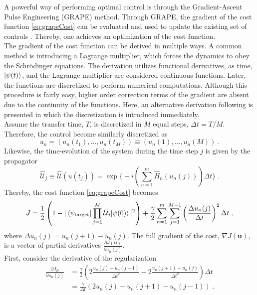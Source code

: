 A powerful way of performing optimal control is through the Gradient-Ascent Pulse Engineering (GRAPE) method. Through GRAPE, the gradient of the cost function \eqref{eq:grapeCost} can be evaluated and used to update the existing set of controls \cite{Khaneja2005}. Thereby, one achieves an optimization of the cost function.\\
The gradient of the cost function can be derived in multiple ways. A common method \cite{Hohenester2007, Winckel2008, BECcontrol} is introducing a Lagrange multiplier, which forces the dynamics to obey the Schrödinger equations. The derivation utilizes functional derivatives, as time, $\ket{\psi (t)}$, and the Lagrange multiplier are considered continuous functions. Later, the functions are discretized to perform numerical computations. Although this procedure is fairly easy, higher order correction terms of the gradient are absent due to the continuity of the functions. Here, an alternative derivation following \cite{Khaneja2005, deFouquieres2011} is presented in which the discretization is introduced immediately. \\
Assume the transfer time, $T$, is discretized in $M$ equal steps, $\Delta t = T/M$. Therefore, the control become similarly discretized as
\begin{equation}
	u_n = \left( u_n (t_1) , \ldots , u_n (t_M)  \right) \equiv \left( u_n (1) , \ldots , u_n (M)  \right) \; .
\end{equation}
Likewise, the time-evolution of the system during the time step $j$ is given by the propagator
\begin{equation}
	\hat{\mathcal{U}}_j \equiv \hat{\mathcal{U}} (u(t_j)) = \exp \bigg\{ -i \left(  \sum_{n = 1}^{m}  \hat{H}_n (u_n(j))  \right) \Delta t \bigg\} \; . 
\end{equation} 
Thereby, the cost function \eqref{eq:grapeCost} becomes
\begin{equation}
	J = \frac{1}{2} \left( 1 - |\braket{\psi_{\mathrm{target}} | \prod_{j = 1}^{M} \hat{\mathcal{U}}_j | \psi (0)}|^2 \right) + \frac{\gamma}{2} \sum_{n = 1}^{m} \sum_{j = 1}^{M-1} \left( \frac{\Delta u_n (j)}{\Delta t} \right)^2 \Delta t \; ,
	\label{eq:discreteCost}
\end{equation}
where $\Delta u_n (j) =  u_n (j+1) - u_n (j)$. The full gradient of the cost, $\nabla J(\boldsymbol{u})$, is a vector of partial derivatives $\frac{\partial J(\boldsymbol{u})}{\partial u_n (j)}$.\\
First, consider the derivative of the regularization
\begin{align}
	\frac{\partial J_R}{\partial u_n (j)} &= \frac{\gamma}{2} \left( 2 \frac{u_n (j) - u_n (j-1)}{\Delta t^2} - 2 \frac{u_n (j+1) - u_n (j)}{\Delta t^2} \right) \Delta t \nonumber \\
	&= \frac{\gamma}{\Delta t} \left( 2 u_n (j) - u_n (j+1) - u_n (j-1) \right) \; . \label{eq:regularizationGrad}
\end{align}
